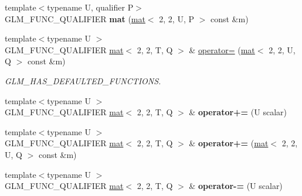 \begin{DoxyCompactItemize}
\mbox{\label{structglm_1_1mat_3_012_00_012_00_01T_00_01Q_01_4_a52bcdb1c70c661f4395a467f2e53c721}} 
{\footnotesize template$<$typename U, qualifier P$>$ }\\G\+L\+M\+\_\+\+F\+U\+N\+C\+\_\+\+Q\+U\+A\+L\+I\+F\+I\+ER {\bfseries mat} (\hyperlink{structglm_1_1mat}{mat}$<$ 2, 2, U, P $>$ const \&m)
\item 
\mbox{\label{structglm_1_1mat_3_012_00_012_00_01T_00_01Q_01_4_a0a12c77df1fd1d153f4fb6be53253f8d}} 
{\footnotesize template$<$typename U $>$ }\\G\+L\+M\+\_\+\+F\+U\+N\+C\+\_\+\+Q\+U\+A\+L\+I\+F\+I\+ER \hyperlink{structglm_1_1mat}{mat}$<$ 2, 2, T, Q $>$ \& \hyperlink{structglm_1_1mat_3_012_00_012_00_01T_00_01Q_01_4_a0a12c77df1fd1d153f4fb6be53253f8d}{operator=} (\hyperlink{structglm_1_1mat}{mat}$<$ 2, 2, U, Q $>$ const \&m)
\begin{DoxyCompactList}\small\item\em G\+L\+M\+\_\+\+H\+A\+S\+\_\+\+D\+E\+F\+A\+U\+L\+T\+E\+D\+\_\+\+F\+U\+N\+C\+T\+I\+O\+NS. \end{DoxyCompactList}\item 
\mbox{\label{structglm_1_1mat_3_012_00_012_00_01T_00_01Q_01_4_a989c77fac3c3679eb4dd7fdece75d179}} 
{\footnotesize template$<$typename U $>$ }\\G\+L\+M\+\_\+\+F\+U\+N\+C\+\_\+\+Q\+U\+A\+L\+I\+F\+I\+ER \hyperlink{structglm_1_1mat}{mat}$<$ 2, 2, T, Q $>$ \& {\bfseries operator+=} (U scalar)
\item 
\mbox{\label{structglm_1_1mat_3_012_00_012_00_01T_00_01Q_01_4_ac200613a912b6413704bf8aa5677825c}} 
{\footnotesize template$<$typename U $>$ }\\G\+L\+M\+\_\+\+F\+U\+N\+C\+\_\+\+Q\+U\+A\+L\+I\+F\+I\+ER \hyperlink{structglm_1_1mat}{mat}$<$ 2, 2, T, Q $>$ \& {\bfseries operator+=} (\hyperlink{structglm_1_1mat}{mat}$<$ 2, 2, U, Q $>$ const \&m)
\item 
\mbox{\label{structglm_1_1mat_3_012_00_012_00_01T_00_01Q_01_4_ad8f70b802e239d71a22c436849401a66}} 
{\footnotesize template$<$typename U $>$ }\\G\+L\+M\+\_\+\+F\+U\+N\+C\+\_\+\+Q\+U\+A\+L\+I\+F\+I\+ER \hyperlink{structglm_1_1mat}{mat}$<$ 2, 2, T, Q $>$ \& {\bfseries operator-\/=} (U scalar)

\end{DoxyCompactItemize}

